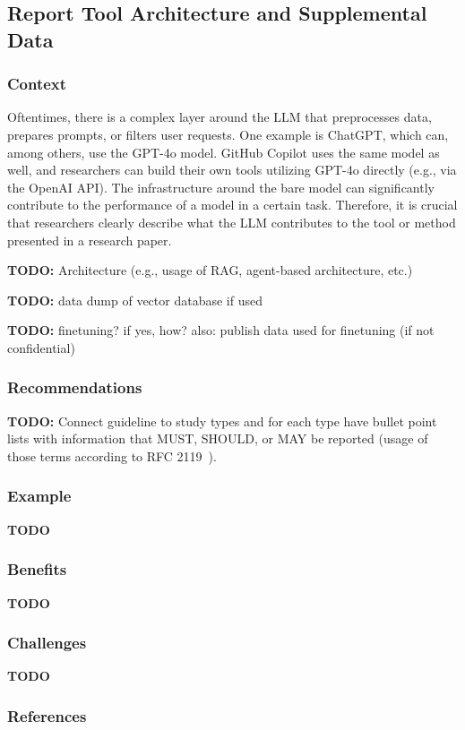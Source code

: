 \documentclass[11pt]{article}
\begin{document}
\subsection{Report Tool Architecture and Supplemental Data}

\subsubsection{Context}

Oftentimes, there is a complex layer around the LLM that preprocesses data, prepares prompts, or filters user requests.
One example is ChatGPT, which can, among others, use the GPT-4o model.
GitHub Copilot uses the same model as well, and researchers can build their own tools utilizing GPT-4o directly (e.g., via the OpenAI API).
The infrastructure around the bare model can significantly contribute to the performance of a model in a certain task.
Therefore, it is crucial that researchers clearly describe what the LLM contributes to the tool or method presented in a research paper.

\textbf{TODO:} Architecture (e.g., usage of RAG, agent-based architecture, etc.)

\textbf{TODO:} data dump of vector database if used

\textbf{TODO:} finetuning? if yes, how? also: publish data used for finetuning (if not confidential)

\subsubsection{Recommendations}

\textbf{TODO:} Connect guideline to study types and for each type have bullet point lists with information that MUST, SHOULD, or MAY be reported (usage of those terms according to RFC 2119~\cite{rfc2119}).

\subsubsection{Example}

\textbf{TODO}

\subsubsection{Benefits}

\textbf{TODO}

\subsubsection{Challenges}

\textbf{TODO}

\subsubsection{References}



\end{document}
